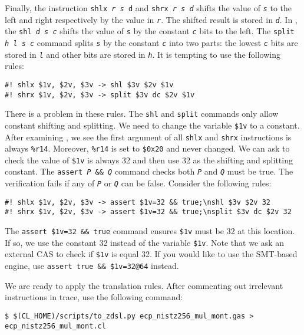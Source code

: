 \documentclass{amsproc}
\begin{document}
Finally, the \xeightysix instruction \texttt{shlx \textit{r}
  \textit{s} \texttt{d}} and \texttt{shrx \textit{r} \textit{s}
  \textit{d}} shifts the value of \texttt{\textit{s}} to the left and
right respectively by the value in \texttt{\textit{r}}. The shifted
result is stored in \texttt{\textit{d}}. In \cryptoline, the
\texttt{shl \textit{d} \textit{s} \textit{c}} shifts the value of
\texttt{\textit{s}} by the constant \texttt{\textit{c}} bits to the
left. The \texttt{split \textit{h} \textit{l} \textit{s} \textit{c}}
command splits \texttt{\textit{s}} by the constant \texttt{\textit{c}}
into two parts: the lowest \texttt{\textit{c}} bits are stored in
\texttt{\textit{l}} and other bits are stored in \texttt{\textit{h}}.
It is tempting to use the following rules:
\begin{verbatim}
#! shlx $1v, $2v, $3v -> shl $3v $2v $1v
#! shrx $1v, $2v, $3v -> split $3v dc $2v $1v
\end{verbatim}
There is a problem in these rules. The \texttt{shl} and
\texttt{split} commands only allow constant shifting and splitting. We
need to change the variable \texttt{\$1v} to a constant. After
examining \nistzmul, we see the first argument of all \texttt{shlx}
and \texttt{shrx} instructions is always \texttt{\%r14}. Moreover,
\texttt{\%r14} is set to \texttt{\$0x20} and never changed. We can ask
\cryptoline to check the value of \texttt{\$1v} is always 32 and then
use 32 as the shifting and splitting constant. The \cryptoline
\texttt{assert \textit{P} \&\& \textit{Q}} command checks both
\texttt{\textit{P}} and \texttt{\textit{Q}} must be true. The
verification fails if any of \texttt{\textit{P}} or
\texttt{\textit{Q}} can be false. Consider the following rules:
\begin{verbatim}
#! shlx $1v, $2v, $3v -> assert $1v=32 && true;\nshl $3v $2v 32
#! shrx $1v, $2v, $3v -> assert $1v=32 && true;\nsplit $3v dc $2v 32
\end{verbatim}
The \texttt{assert \$1v=32 \&\& true} command ensures \texttt{\$1v}
must be 32 at this location. If so, we use the constant 32 instead of
the variable \texttt{\$1v}. Note that we ask an external CAS to check
if \texttt{\$1v} is equal 32. If you would like to use the SMT-based
engine, use \texttt{assert true \&\& \$1v=32@64} instead.

We are ready to apply the translation rules. After commenting out
irrelevant instructions in trace, use the following command:
\begin{verbatim}
$ $(CL_HOME)/scripts/to_zdsl.py ecp_nistz256_mul_mont.gas > ecp_nistz256_mul_mont.cl
\end{verbatim}
\end{document}
